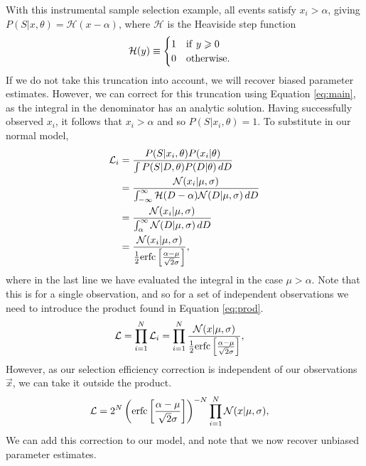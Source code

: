 \documentclass[a4paper,fleqn,usenatbib]{mnras}
\begin{document}
With this instrumental sample selection example, all events satisfy $x_i > \alpha$, giving $P(S|x,\theta) = \mathcal{H}(x - \alpha)$, where $\mathcal{H}$ is the Heaviside step function
\begin{align}
\mathcal{H}(y)\equiv \begin{cases}
1 \quad {\rm if }\  y \ge 0 \\
0 \quad {\rm otherwise.}
\end{cases}
\end{align} 
If we do not take this truncation into account, we will recover biased parameter estimates. However, we can correct for this truncation using Equation \eqref{eq:main}, as the integral in the denominator has an analytic solution. Having successfully observed $x_i$, it follows that $x_i > \alpha$ and so $P(S|x_i,\theta) = 1$. To substitute in our normal model,
\begin{align}
\mathcal{L}_i &= \frac{P(S|x_i,\theta) P(x_i|\theta)}{\int P(S | D, \theta) P(D|\theta)\, dD} \\
&= \frac{ \mathcal{N}(x_i|\mu, \sigma)}{\int_{-\infty}^\infty \mathcal{H}(D - \alpha) \mathcal{N}(D|\mu, \sigma)\, dD} \\
&= \frac{ \mathcal{N}(x_i|\mu, \sigma)}{\int_{\alpha}^\infty \mathcal{N}(D|\mu, \sigma)\, dD} \\
&= \frac{ \mathcal{N}(x_i|\mu, \sigma)}{\frac{1}{2} {\rm erfc}\left[ \frac{\alpha - \mu}{\sqrt{2}\sigma} \right]}, 
\end{align}
where in the last line we have evaluated the integral in the case $\mu > \alpha$. Note that this is for a single observation, and so for a set of independent observations we need to introduce the product found in Equation \eqref{eq:prod}. 
\begin{align}
\mathcal{L} &= \prod_{i=1}^N \mathcal{L}_i =  \prod_{i=1}^N \frac{ \mathcal{N}(x|\mu, \sigma)}{\frac{1}{2} {\rm erfc}\left[ \frac{\alpha - \mu}{\sqrt{2}\sigma} \right]}, 
\end{align}
However, as our selection efficiency correction is independent of our observations $\vec{x}$, we can take it outside the product.
\begin{align}
\mathcal{L} &= 2^N \left( {\rm erfc}\left[ \frac{\alpha - \mu}{\sqrt{2}\sigma} \right] \right)^{-N}\prod_{i=1}^N  \mathcal{N}(x|\mu, \sigma),
\end{align}
We can add this correction to our model, and note that we now recover unbiased parameter estimates. 
\end{document}
